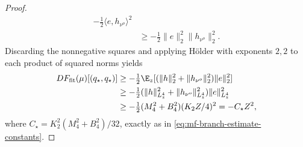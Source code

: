 \begin{proof}
\[\begin{aligned}
       -\tfrac12\langle e,h_{\nu^o}\rangle^2\\
 &\ge-\tfrac12\|e\|_2^2\|h_{\nu^o}\|_2^2.
\end{aligned}
\]
Discarding the nonnegative squares and applying H\"older with exponents
\(2,2\) to each product of squared norms yields
\begin{align}
 DF_{\mathrm{fit}}(\mu)[(q_\star,q_\star)]
 &\ge-\tfrac12\E_z[(\|h\|_2^2+\|h_{\nu^o}\|_2^2)\|e\|_2^2]\notag\\
 &\ge-\tfrac12(\|h\|_{L^4_z}^2+\|h_{\nu^o}\|_{L^4_z}^2)
                          \|e\|_{L^4_z}^2\notag\\
 &\ge-\tfrac12(M_4^2+B_4^2)(K_2Z/4)^2=-C_\star Z^2,
 \label{eq:mf-contraction-square-completion}
\end{align}
where \(C_\star=K_2^2(M_4^2+B_4^2)/32\), exactly as in
\cref{eq:mf-branch-estimate-constants}.


\end{proof}
